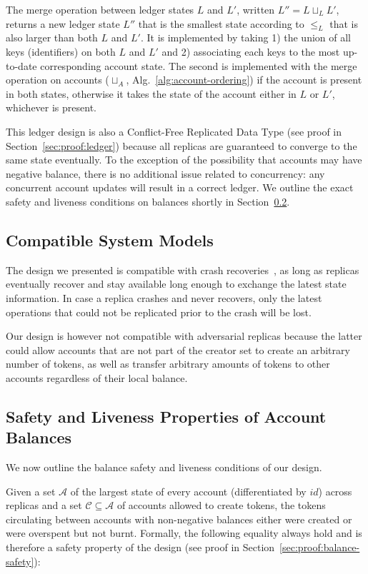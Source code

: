 \documentclass[9pt]{article}   	%
\begin{document}
The merge operation between ledger states $L$ and $L'$, written $L'' = L \sqcup_L L'$, returns a new ledger state $L''$ that is the smallest state according to $\leq_L$ that is also larger than both $L$ and $L'$. It is implemented by taking 1) the union of all keys (identifiers) on both $L$ and $L'$ and 2) associating each keys to the most up-to-date corresponding account state. The second is implemented with the merge operation on accounts ($\sqcup_A$, Alg.~\ref{alg:account-ordering}) if the account is present in both states, otherwise it takes the state of the account either in $L$ or $L'$, whichever is present.


This ledger design is also a Conflict-Free Replicated Data Type (see proof in Section~\ref{sec:proof:ledger}) because all replicas are guaranteed to converge to the same state eventually. To the exception of the possibility that accounts may have negative balance, there is no additional issue related to concurrency: any concurrent account updates will result in a correct ledger. We outline the exact safety and liveness conditions on balances shortly in Section~\ref{sec:safety-liveness}.

\subsection{Compatible System Models}

The design we presented is compatible with crash recoveries~\cite{cachin2011introduction}, as long as replicas eventually recover and stay available long enough to exchange the latest state information. In case a replica crashes and never recovers, only the latest operations that could not be replicated prior to the crash will be lost. 

Our design is however not compatible with adversarial replicas because the latter could allow accounts that are not part of the creator set to create an arbitrary number of tokens, as well as transfer arbitrary amounts of tokens to other accounts regardless of their local balance. 


\subsection{Safety and Liveness Properties of Account Balances}
\label{sec:safety-liveness}

We now outline the balance safety and liveness conditions of our design.

Given a set $\mathcal{A}$ of the largest state of every account (differentiated by $id$) across replicas and a set $\mathcal{C \subseteq \mathcal{A}}$ of accounts allowed to create tokens, the tokens circulating between accounts with non-negative balances either were created or were overspent but not burnt. Formally, the following equality always hold and is therefore a safety property of the design (see proof in Section~\ref{sec:proof:balance-safety}):
\end{document}
